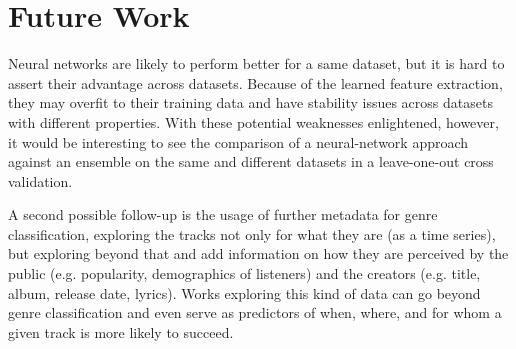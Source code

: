 \section{Future Work}

Neural networks are likely to perform better for a same dataset, but it is hard to assert their advantage across datasets. Because of the learned feature extraction, they may overfit to their training data and have stability issues across datasets with different properties. With these potential weaknesses enlightened, however, it would be interesting to see the comparison of a neural-network approach against an ensemble on the same and different datasets in a leave-one-out cross validation.

A second possible follow-up is the usage of further metadata for genre classification, exploring the tracks not only for what they are (as a time series), but exploring beyond that and add information on how they are perceived by the public (e.g. popularity, demographics of listeners) and the creators (e.g. title, album, release date, lyrics). Works exploring this kind of data can go beyond genre classification and even serve as predictors of when, where, and for whom a given track is more likely to succeed.
